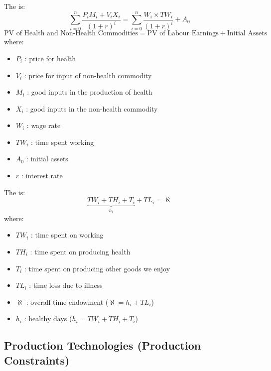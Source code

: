         The  is:
        \begin{equation*}
            \sum_{i=0}^n\frac{P_iM_i+V_iX_i}{(1+r)^i}=\sum_{i=0}^n\frac{W_i \times TW_i}{(1+r)^i}+ A_0
        \end{equation*}
        \begin{equation*}
            \text{PV of Health and Non-Health Commodities} = \text{PV of Labour Earnings} + \text{Initial Assets}
        \end{equation*}
        where:
        \begin{itemize}
            \item $P_i$ : price for health
            \item $V_i$ : price for input of non-health commodity
            \item $M_i$ : good inputs in the production of health
            \item $X_i$ : good inputs in the non-health commodity
            \item $W_i$ : wage rate
            \item $TW_i$ : time spent working 
            \item $A_0$ : initial assets
            \item $r$ : interest rate
        \end{itemize}
        The  is:
        \begin{equation*}
            \underbrace{TW_i+TH_i+T_i}_{h_i} +TL_i= \aleph
        \end{equation*}
        where:
        \begin{itemize}
            \item $TW_i$ : time spent on working
            \item $TH_i$ : time spent on producing health
            \item $T_i$ : time spent on producing other goods we enjoy
            \item $TL_i$ : time loss due to illness
            \item  $\aleph$  : overall time endowment ($\aleph = h_i + TL_i$)
            \item $h_i$ : healthy days ($h_i=TW_i+TH_i+T_i$)
        \end{itemize}    
    
    \subsection{Production Technologies (Production Constraints)}\label{sec:health_tech_cons}
    
